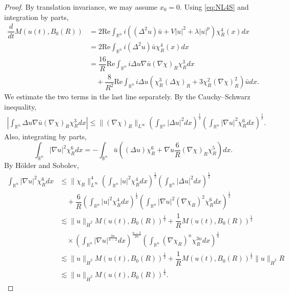 \documentclass[11pt,a4paper]{article}
\numberwithin{equation}{section}
\begin{document}
\begin{proof}
By translation invariance, we may assume $x_{0}=0$.
Using \eqref{eq:NL4S} and integration by parts,
\begin{equation}\label{loacal math derivative}
\begin{aligned}
\dfrac{d}{dt}M(u(t), B_{0}(R))
&= 2\text{Re}\int_{\mathbb{R}^{n}} i((\Delta^{2}u) \bar{u} + V|u|^{2} + \lambda|u|^{p})\chi_{R}^{4}(x)dx \\
&= 2\text{Re}\int_{\mathbb{R}^{n}} i(\Delta^{2}u) \bar{u} \chi_{R}^{4}(x)dx \\
&= \dfrac{16}{R} \text{Re}\int_{\mathbb{R}^{n}} i\Delta u \nabla \bar{u}(\nabla \chi)_{R} \chi_{R}^{3}dx \\
&\quad + \dfrac{8}{R^{2}} \text{Re} \int_{\mathbb{R}^{n}} i\Delta u\left( \chi_{R}^{3} (\Delta \chi)_{R} + 3\chi_{R}^{2}(\nabla \chi)_{R}^{2}\right)\bar{u} dx.
\end{aligned}
\end{equation}
We estimate the two terms in the last line separately.
By the Cauchy--Schwarz inequality,
\begin{align*}
\left|\int_{\mathbb{R}^{n}} \Delta u \nabla \bar{u}(\nabla \chi)_{R} \chi_{R}^{3}dx \right|
\leq \|(\nabla \chi)_{R}\|_{L^{\infty}}\left( \int_{\mathbb{R}^{n}}|\Delta u|^{2} dx\right)^{\frac{1}{2}}\left(\int_{\mathbb{R}^{n}} |\nabla u|^{2}\chi_{R}^{6} dx\right)^{\frac{1}{2}}.
\end{align*}
Also, integrating by parts,
\[
 \int_{\mathbb{R}^{n}} |\nabla u|^{2}\chi_{R}^{6} dx
 = -\int_{\mathbb{R}^{n}} \bar{u}\left( (\Delta u) \chi_{R}^{6} + \nabla u\dfrac{6}{R}(\nabla \chi)_{R} \chi_{R}^{5} \right) dx.
\]
By H\"older and Sobolev,
\begin{equation}
\begin{aligned}
\int_{\mathbb{R}^{n}} |\nabla u|^{2}\chi_{R}^{6} dx
&\leq \|\chi_{R}\|_{L^{\infty}}^{4} \left(\int_{\mathbb{R}^{n}} |u|^{2}\chi_{R}^{4} dx\right)^{\frac{1}{2}} \left(\int_{\mathbb{R}^{n}} |\Delta u|^{2}dx \right)^{\frac{1}{2}} \\
&\quad + \dfrac{6}{R} \left(\int_{\mathbb{R}^{n}} |u|^{2}\chi_{R}^{4} dx\right)^{\frac{1}{2}} \left(\int_{\mathbb{R}^{n}} |\nabla u|^{2}(\nabla \chi_{R})^{2}\chi_{R}^{6} dx\right)^{\frac{1}{2}} \\
&\lesssim \|u\|_{\dot{H}^{2}}M(u(t), B_{0}(R))^{\frac{1}{2}} + \dfrac{1}{R}M(u(t), B_{0}(R))^{\frac{1}{2}} \\
&\quad \times \left(\int_{\mathbb{R}^{n}} |\nabla u|^{\frac{2n}{n-2}}dx\right)^{\frac{n-2}{2n}} \left(\int_{\mathbb{R}^{n}}(\nabla \chi_{R})^{n}\chi_{R}^{3n} dx\right)^{\frac{1}{n}} \\
&\lesssim \|u\|_{\dot{H}^{2}}M(u(t), B_{0}(R))^{\frac{1}{2}} + \dfrac{1}{R}M(u(t), B_{0}(R))^{\frac{1}{2}}\|u\|_{\dot{H}^{2}}R \\
&\lesssim \|u\|_{\dot{H}^{2}}M(u(t), B_{0}(R))^{\frac{1}{2}}.
\end{aligned}
\end{equation}


\end{proof}
\end{document}
